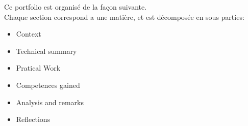Ce portfolio est organisé de la façon suivante.\\
Chaque section correspond a une matière, et est décomposée en sous parties:
\begin{itemize}
    \item Context
    \item Technical summary
    \item Pratical Work
    \item Competences gained
    \item Analysis and remarks
    \item Reflections
\end{itemize}